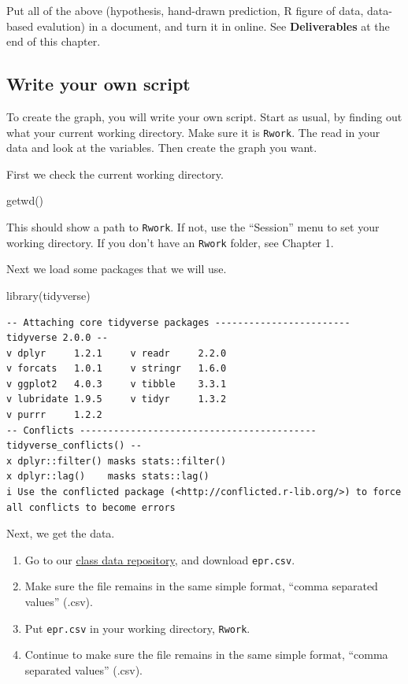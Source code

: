 \documentclass[
  letterpaper,
  DIV=11,
  numbers=noendperiod]{scrreprt}
\newenvironment{Shaded}{\begin{snugshade}}{\end{snugshade}}
\newcommand{\FunctionTok}[1]{\textcolor[rgb]{0.28,0.35,0.67}{#1}}
\newcommand{\NormalTok}[1]{\textcolor[rgb]{0.00,0.23,0.31}{#1}}
\providecommand{\tightlist}{%
  \setlength{\itemsep}{0pt}\setlength{\parskip}{0pt}}
\begin{document}
Put all of the above (hypothesis, hand-drawn prediction, R figure of
data, data-based evalution) in a document, and turn it in online. See
\textbf{Deliverables} at the end of this chapter.

\subsection{Write your own script}\label{write-your-own-script}

To create the graph, you will write your own script. Start as usual, by
finding out what your current working directory. Make sure it is
\texttt{Rwork}. The read in your data and look at the variables. Then
create the graph you want.

First we check the current working directory.

\begin{Shaded}
\begin{Highlighting}[]
\FunctionTok{getwd}\NormalTok{()}
\end{Highlighting}
\end{Shaded}

This should show a path to \texttt{Rwork}. If not, use the ``Session''
menu to set your working directory. If you don't have an \texttt{Rwork}
folder, see Chapter 1.

Next we load some packages that we will use.

\begin{Shaded}
\begin{Highlighting}[]
\FunctionTok{library}\NormalTok{(tidyverse)}
\end{Highlighting}
\end{Shaded}

\begin{verbatim}
-- Attaching core tidyverse packages ------------------------ tidyverse 2.0.0 --
v dplyr     1.2.1     v readr     2.2.0
v forcats   1.0.1     v stringr   1.6.0
v ggplot2   4.0.3     v tibble    3.3.1
v lubridate 1.9.5     v tidyr     1.3.2
v purrr     1.2.2     
-- Conflicts ------------------------------------------ tidyverse_conflicts() --
x dplyr::filter() masks stats::filter()
x dplyr::lag()    masks stats::lag()
i Use the conflicted package (<http://conflicted.r-lib.org/>) to force all conflicts to become errors
\end{verbatim}

Next, we get the data.

\begin{enumerate}
\def\labelenumi{\arabic{enumi}.}
\tightlist
\item
  Go to our
  \href{https://drive.google.com/drive/u/1/folders/1FR2FLiW3xyD4Er52YzVTToPZuXXReGRo}{class
  data repository}, and download \texttt{epr.csv}.
\item
  Make sure the file remains in the same simple format, ``comma
  separated values'' (.csv).
\item
  Put \texttt{epr.csv} in your working directory, \texttt{Rwork}.
\item
  Continue to make sure the file remains in the same simple format,
  ``comma separated values'' (.csv).
\end{enumerate}
\end{document}

